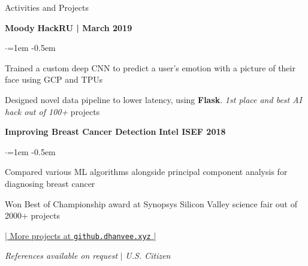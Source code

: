 \documentclass[mm,centered]{resume} %
\begin{document}
\begin{rSection}{Activities and Projects}

{\bf Moody}  \hfill {\bf HackRU | March 2019}
 \begin{list}{$\cdot$}{\leftmargin=1em} %
   \itemsep -0.5em \vspace{-0.5em} %
	\item Trained a custom deep CNN to predict a user’s emotion with a picture of their face using GCP and TPUs
	\item Designed novel data pipeline to lower latency, using \textbf{Flask}. \emph{1st place and best AI hack out of 100+} projects
  \end{list}

{\bf Improving Breast Cancer Detection}  \hfill {\bf Intel ISEF 2018}
 \begin{list}{$\cdot$}{\leftmargin=1em} %
   \itemsep -0.5em \vspace{-0.5em} %
	\item Compared various ML algorithms alongside principal component analysis for diagnosing breast cancer
	\item Won Best of Championship award at Synopsys Silicon Valley science fair out of 2000+ projects
  \end{list}

\vspace{-1mm}
\begin{center}
	\href{http://github.dhanvee.xyz}{| More projects at \texttt{github.dhanvee.xyz} |}
\end{center}
\vspace{-2mm}
\end{rSection}

\begin{center}
	\vspace{4.25mm}
	{\textit{References available on request} \hspace{1mm} $\vert$ \hspace{1mm} \textit{U.S. Citizen}}
\end{center}
\end{document}
